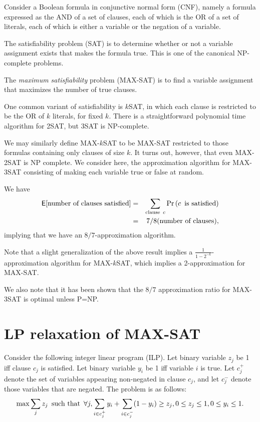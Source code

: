 \documentclass{article}
\renewcommand{\Pr}[1]{\textrm{\textup{Pr}}\left( #1 \right)}
\newcommand{\E}{\mbox{$\mathsf E$}}
\begin{document}
Consider a Boolean formula in conjunctive normal form (CNF), namely a formula expressed as the AND of a set of clauses, each of which is the OR of a set of literals, each of which is either a variable or the negation of a variable.

The satisfiability problem (SAT) is to determine whether or not a variable assignment exists that makes the formula true.  This is one of the canonical NP-complete problems.

The \emph{maximum satisfiability} problem (MAX-SAT) is to find a variable assignment that maximizes the number of true clauses.

One common variant of satisfiability is $k$SAT, in which each clause is restricted to be the OR of $k$ literals, for fixed $k$.  There is a straightforward polynomial time algorithm for 2SAT, but 3SAT is NP-complete.

We may similarly define MAX-$k$SAT to be MAX-SAT restricted to those formulas containing only clauses of size $k$.  It turns out, however, that even MAX-2SAT is NP complete.  We consider here, the approximation algorithm for MAX-3SAT consisting of making each variable true or false at random.

We have 
\begin{align}
\E[\textrm{number of clauses satisfied}]&=&\sum_{\textrm{clause\enspace} c}\Pr{c\textrm{\enspace is satisfied}}\\
&=&7/8 (\textrm{number of clauses}),
\end{align}
implying that we have an $8/7$-approximation algorithm.

Note that a slight generalization of the above result implies a $\frac{1}{1-2^{-k}}$-approximation algorithm for MAX-$k$SAT, which implies a 2-approximation for MAX-SAT.

We also note that it has been shown that the $8/7$ approximation ratio for MAX-3SAT is optimal unless P=NP.

\section{LP relaxation of MAX-SAT}

Consider the following integer linear program (ILP).  Let binary variable $z_j$ be 1 iff clause $c_j$ is satisfied.  Let binary variable $y_i$ be 1 iff variable $i$ is true.  Let $c_j^+$ denote the set of variables appearing non-negated in clause $c_j$, and let $c_j^-$ denote those variables that are negated.  The problem is as follows:
$$\max\sum_j z_j \textrm{\enspace such that\enspace} \forall j, \sum_{i\in c_j^+}y_i+\sum_{i\in c_j^-}(1-y_i)\geq z_j, 0\leq z_j\leq 1, 0\leq y_i\leq 1.$$
\end{document}

